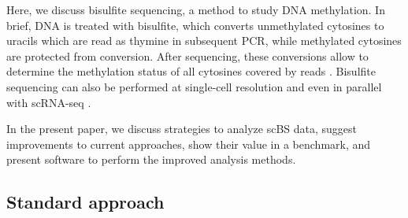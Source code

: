 \documentclass[twocolumn,10pt]{article}
\begin{document}
Here, we discuss bisulfite sequencing, a method to study DNA methylation. In brief, DNA is treated with bisulfite, which converts unmethylated cytosines to uracils which are read as thymine in subsequent PCR, while methylated cytosines are protected from conversion. After sequencing, these conversions allow to determine the methylation status of all cytosines covered by reads \citep{Frommer_1992}. Bisulfite sequencing can also be performed at single-cell resolution \citep{Smallwood_2014} and even in parallel with scRNA-seq \citep{scMTseq,Clark2018}.

In the present paper, we discuss strategies to analyze scBS data, suggest improvements to current approaches, show their value in a benchmark, and present software to perform the improved analysis methods.

\subsection{Standard approach}
\end{document}

